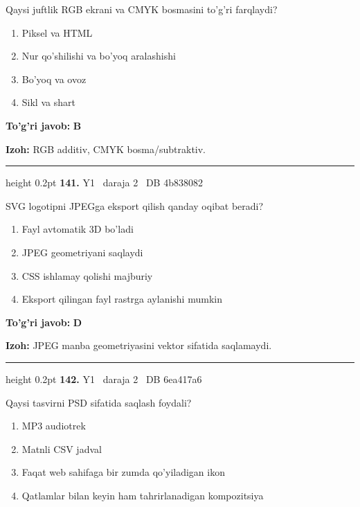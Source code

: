 \documentclass[10pt,a4paper,oneside]{article}
\begin{document}
Qaysi juftlik RGB ekrani va CMYK bosmasini to'g'ri farqlaydi?
\begin{enumerate}[label=\Alph*),leftmargin=9mm]
\item Piksel va HTML
\item Nur qo'shilishi va bo'yoq aralashishi
\item Bo'yoq va ovoz
\item Sikl va shart
\end{enumerate}
\begin{tcolorbox}[enhanced,breakable,colback=teal!4,colframe=teal!45!black,boxrule=0.45pt,arc=1.2mm,left=2.8mm,right=2.8mm,top=2mm,bottom=2mm,before skip=2mm,after skip=2mm]
\textbf{\color{teal}To'g'ri javob:} \textbf{B}
\par\smallskip
\textbf{Izoh:} RGB additiv, CMYK bosma/subtraktiv.
\end{tcolorbox}
\vspace{2mm}\hrule height 0.2pt \vspace{4mm}
\hypertarget{q141}{\textbf{\color{ink}141.}}  {\color{muted}\scriptsize Y1 \textbullet\ daraja 2 \textbullet\ DB 4b838082}
\par
SVG logotipni JPEGga eksport qilish qanday oqibat beradi?
\begin{enumerate}[label=\Alph*),leftmargin=9mm]
\item Fayl avtomatik 3D bo'ladi
\item JPEG geometriyani saqlaydi
\item CSS ishlamay qolishi majburiy
\item Eksport qilingan fayl rastrga aylanishi mumkin
\end{enumerate}
\begin{tcolorbox}[enhanced,breakable,colback=teal!4,colframe=teal!45!black,boxrule=0.45pt,arc=1.2mm,left=2.8mm,right=2.8mm,top=2mm,bottom=2mm,before skip=2mm,after skip=2mm]
\textbf{\color{teal}To'g'ri javob:} \textbf{D}
\par\smallskip
\textbf{Izoh:} JPEG manba geometriyasini vektor sifatida saqlamaydi.
\end{tcolorbox}
\vspace{2mm}\hrule height 0.2pt \vspace{4mm}
\hypertarget{q142}{\textbf{\color{ink}142.}}  {\color{muted}\scriptsize Y1 \textbullet\ daraja 2 \textbullet\ DB 6ea417a6}
\par
Qaysi tasvirni PSD sifatida saqlash foydali?
\begin{enumerate}[label=\Alph*),leftmargin=9mm]
\item MP3 audiotrek
\item Matnli CSV jadval
\item Faqat web sahifaga bir zumda qo'yiladigan ikon
\item Qatlamlar bilan keyin ham tahrirlanadigan kompozitsiya
\end{enumerate}
\end{document}
